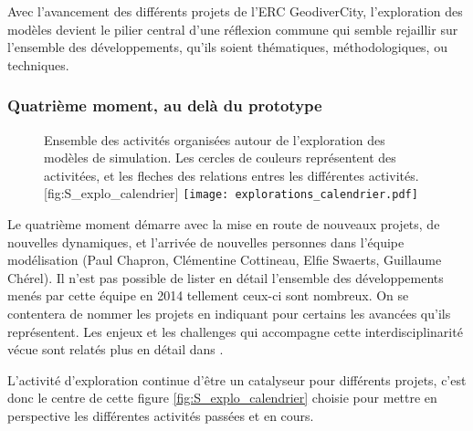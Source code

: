 Avec l'avancement des différents projets de l'ERC GeodiverCity, l'exploration des modèles devient le pilier central d'une réflexion commune qui semble rejaillir sur l'ensemble des développements, qu'ils soient thématiques, méthodologiques, ou techniques.

\subsubsection{Quatrième moment, au delà du prototype}
\label{sssec:quatrieme_moment}

\begin{figure}[t]
\begin{sidecaption}{Ensemble des activités organisées autour de l'exploration des modèles de simulation. Les cercles de couleurs représentent des activitées, et les fleches des relations entres les différentes activités.}[fig:S_explo_calendrier]
  \centering
 \texttt{[image: explorations\_calendrier.pdf]}
  \end{sidecaption}
\end{figure}


Le quatrième moment démarre avec la mise en route de nouveaux projets, de nouvelles dynamiques, et l'arrivée de nouvelles personnes dans l'équipe modélisation (Paul Chapron, Clémentine Cottineau, Elfie Swaerts, Guillaume Chérel). Il n'est pas possible de lister en détail l'ensemble des développements menés par cette équipe en 2014 tellement ceux-ci sont nombreux. On se contentera de nommer les projets en indiquant pour certains les avancées qu'ils représentent. Les enjeux et les challenges qui accompagne cette interdisciplinarité vécue sont relatés plus en détail dans \textcite{Chapron2014}.

L'activité d'exploration continue d'être un catalyseur pour différents projets, c'est donc le centre de cette figure \ref{fig:S_explo_calendrier} choisie pour mettre en perspective les différentes activités passées et en cours.

